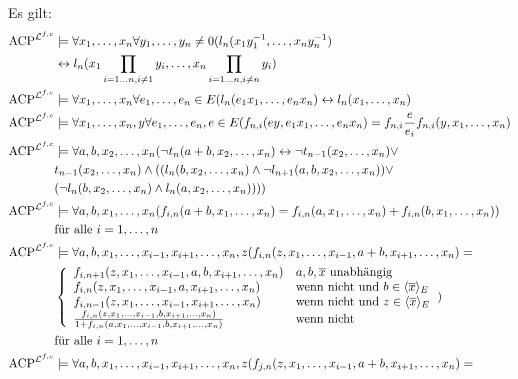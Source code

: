     \begin{lemma}\label{Eliminierungsregeln}
    	Es gilt:\\
    	\begin{align*}\operatorname{ACP}^{\lfc}&\models\forall x_1,\dots,x_n\forall y_1,\dots,y_n\neq0(l_n(x_1y_1^{-1},\dots,x_ny_n^{-1})\\&\leftrightarrow l_n(x_1\prod\limits_{i=1\dots n,i\neq 1}y_i,\dots,x_n\prod\limits_{i=1\dots n,i\neq n}y_i)\\
    	\operatorname{ACP}^{\lfc}&\models\forall x_1,\dots,x_n\forall e_1,\dots,e_n\in E(l_n(e_1x_1,\dots,e_nx_n)\leftrightarrow l_n(x_1,\dots,x_n)\\
    	\operatorname{ACP}^{\lfc}&\models\forall x_1,\dots,x_n,y\forall e_1,\dots,e_n,e\in E(f_{n,i}(ey,e_1x_1,\dots,e_nx_n)=f_{n,i}\frac{e}{e_i}f_{n,i}(y,x_1,\dots,x_n)\\
    	\operatorname{ACP}^{\lfc}&\models\forall a,b,x_2,\dots,x_n(\neg t_n(a+b,x_2,\dots,x_n)\leftrightarrow\neg t_{n-1}(x_2,\dots,x_n)\lor\\
    	&t_{n-1}(x_2,\dots,x_n)\land((l_n(b,x_2,\dots,x_n)\land\neg l_{n+1}(a,b,x_2,\dots,x_n))\lor\\
    	&(\neg l_n(b,x_2,\dots,x_n)\land l_n(a,x_2,\dots,x_n))))\\
    	\operatorname{ACP}^{\lfc}&\models\forall a,b,x_1,\dots,x_n(f_{i,n}(a+b,x_1,\dots,x_n)=f_{i,n}(a,x_1,\dots,x_n)+f_{i,n}(b,x_1,\dots,x_n))\\
    	&\text{für alle }i=1,\dots,n\\
    	\operatorname{ACP}^{\lfc}&\models\forall a,b,x_1,\dots,x_{i-1},x_{i+1},\dots,x_n,z(f_{i,n}(z,x_1,\dots,x_{i-1},a+b,x_{i+1},\dots,x_n)=\\
    	&\left\{\begin{array}{ll}
    	f_{i,n+1}(z,x_1,\dots,x_{i-1},a,b,x_{i+1},\dots,x_n)& a,b,\overline{x}\text{ unabhängig}\\
    	f_{i,n}(z,x_1,\dots,x_{i-1},a,x_{i+1},\dots,x_n)&\text{wenn nicht und }b\in\langle\overline{x}\rangle_E\\
    	f_{i,n-1}(z,x_1,\dots,x_{i-1},x_{i+1},\dots,x_n)&\text{wenn nicht und }z\in\langle\overline{x}\rangle_E\\
    	\frac{f_{i,n}(z,x_1,\dots,x_{i-1},b,x_{i+1},\dots,x_n)}{1+f_{i,n}(a,x_1,\dots,x_{i-1},b,x_{i+1},\dots,x_n)}&\text{wenn nicht}
    	\end{array}\right.)\\
    	&\text{für alle }i=1,\dots,n\\
    	\operatorname{ACP}^{\lfc}&\models\forall a,b,x_1,\dots,x_{i-1},x_{i+1},\dots,x_n,z(f_{j,n}(z,x_1,\dots,x_{i-1},a+b,x_{i+1},\dots,x_n)=\\

\end{align*}
\end{lemma}
